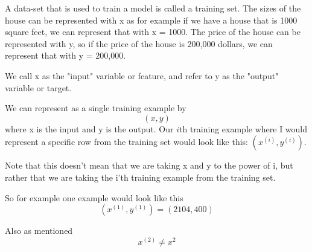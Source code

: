 A data-set that is used to train a model is called a training set. The sizes of the house can be represented with x as for example if we  have a house that is 1000 square feet, we can represent that with x = 1000. The price of the house can be represented with y, so if the price of the house is 200,000 dollars, we can represent that with y = 200,000. 

We call x as the "input" variable or feature, and refer to y as the "output" variable or target. 

We can represent as a single training example by $$(x,y)$$ where x is the input and y is the output.
Our $i$th training example where I would represent a specific row from the training set would look like this: $(x^{(i)},y^{(i)})$.

Note that this doesn't mean that we are taking x and y to the power of i, but rather that we are taking the i'th training example from the training set.

So for example one example would look like this $$ (x^{(1)}, y^{(1)})=(2104,400) $$

Also as mentioned $$x^{(2)}\neq x^2$$

